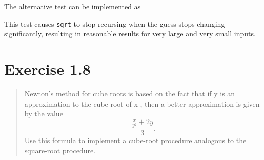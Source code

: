\documentclass{article}
\begin{document}
The alternative test can be implemented as


This test causes \verb|sqrt| to stop recursing when the guess stops changing
significantly, resulting in reasonable results for very large and very small
inputs.

\section{Exercise 1.8}
\begin{quote}
    Newton’s method for cube roots is based on the fact that if y is an
    approximation to the cube root of x , then a better approximation is given
    by the value $$\frac{\frac{x}{y^2} + 2y}{3}.$$  Use this formula to
    implement a cube-root procedure analogous to the square-root procedure.
\end{quote}


\end{document}
